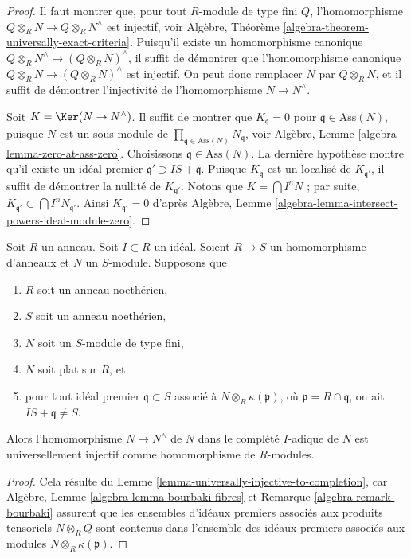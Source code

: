 \begin{proof}
Il faut montrer que, pour tout $R$-module de type fini $Q$, l'homomorphisme
$Q \otimes_R N \to Q \otimes_R N^\wedge$ est injectif, voir
Algèbre, Théorème \ref{algebra-theorem-universally-exact-criteria}.
Puisqu'il existe un homomorphisme canonique $Q \otimes_R N^\wedge \to (Q \otimes_R N)^\wedge$,
il suffit de démontrer que l'homomorphisme canonique
$Q \otimes_R N \to (Q \otimes_R N)^\wedge$ est injectif.
On peut donc remplacer $N$ par $Q \otimes_R N$, et il suffit de démontrer
l'injectivité de l'homomorphisme $N \to N^\wedge$.

\medskip\noindent
Soit $K = \Ker(N \to N^\wedge)$. Il suffit de montrer que
$K_{\mathfrak q} = 0$ pour $\mathfrak q \in \text{Ass}(N)$, puisque $N$ est un
sous-module de $\prod_{\mathfrak q \in \text{Ass}(N)} N_{\mathfrak q}$, voir
Algèbre, Lemme \ref{algebra-lemma-zero-at-ass-zero}.
Choisissons $\mathfrak q \in \text{Ass}(N)$. La dernière hypothèse montre
qu'il existe un idéal premier $\mathfrak q' \supset IS + \mathfrak q$.
Puisque $K_{\mathfrak q}$ est un localisé de $K_{\mathfrak q'}$,
il suffit de démontrer la nullité de $K_{\mathfrak q'}$.
Notons que $K = \bigcap I^nN$ ; par suite,
$K_{\mathfrak q'} \subset \bigcap I^nN_{\mathfrak q'}$.
Ainsi $K_{\mathfrak q'} = 0$ d'après
Algèbre, Lemme \ref{algebra-lemma-intersect-powers-ideal-module-zero}.
\end{proof}

\begin{lemma}
\label{lemma-universally-injective-to-completion-flat}
Soit $R$ un anneau.
Soit $I \subset R$ un idéal.
Soient $R \to S$ un homomorphisme d'anneaux et $N$ un $S$-module.
Supposons que
\begin{enumerate}
\item $R$ soit un anneau noethérien,
\item $S$ soit un anneau noethérien,
\item $N$ soit un $S$-module de type fini,
\item $N$ soit plat sur $R$, et
\item pour tout idéal premier $\mathfrak q \subset S$ associé à
$N \otimes_R \kappa(\mathfrak p)$, où $\mathfrak p = R \cap \mathfrak q$,
on ait $IS + \mathfrak q \not = S$.
\end{enumerate}
Alors l'homomorphisme $N \to N^\wedge$ de $N$ dans le complété $I$-adique de $N$
est universellement injectif comme homomorphisme de $R$-modules.
\end{lemma}

\begin{proof}
Cela résulte du
Lemme \ref{lemma-universally-injective-to-completion},
car
Algèbre, Lemme
\ref{algebra-lemma-bourbaki-fibres} et
Remarque \ref{algebra-remark-bourbaki}
assurent que les ensembles d'idéaux premiers associés aux produits tensoriels
$N \otimes_R Q$ sont contenus dans l'ensemble des idéaux premiers associés aux
modules $N \otimes_R \kappa(\mathfrak p)$.
\end{proof}




